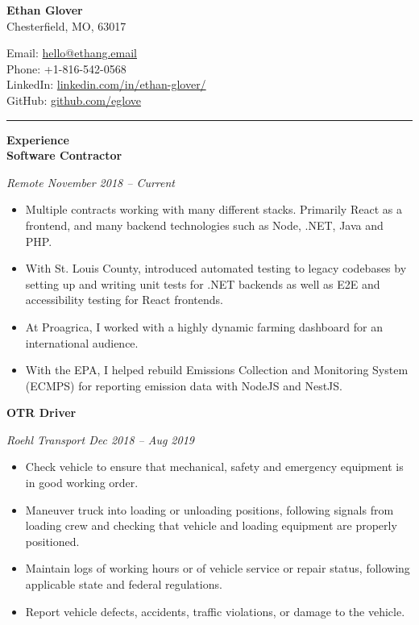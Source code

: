 \documentclass[a4ppaper, 10pt]{article}
\newcommand{\heading}[1]{\vspace{6pt}\noindent\textbf{\large #1}\vspace{4pt}\\}
\newcommand{\subheading}[1]{\vspace{2pt}\noindent\textbf{#1}\par}
\begin{document}
	\begin{center}
		{\LARGE \textbf{Ethan Glover}} \\
		Chesterfield, MO, 63017
		\begin{multicols}{2}
			\raggedright
			Email: \href{mailto:hello@ethang.email}{hello@ethang.email} \\
			Phone: +1-816-542-0568 \\
			LinkedIn: \href{https://www.linkedin.com/in/ethan-glover/}{linkedin.com/in/ethan-glover/} \\
			GitHub: \href{https://github.com/eglove}{github.com/eglove}
		\end{multicols}
	\end{center}
	
	\hrule
	
	\heading{Experience}
	\subheading{Software Contractor}
	\raggedright
	\textit{Remote \hfill November 2018 -- Current} \\
	\begin{itemize}[itemsep=0pt, topsep=2pt]
		\item Multiple contracts working with many different stacks. Primarily React as a frontend, and many backend technologies such as Node, .NET, Java and PHP.
		\item With St. Louis County, introduced automated testing to legacy codebases by setting up and writing unit tests for .NET backends as well as E2E and accessibility testing for React frontends.
		\item At Proagrica, I worked with a highly dynamic farming dashboard for an international audience.
		\item With the EPA, I helped rebuild Emissions Collection and Monitoring System (ECMPS) for reporting emission data with NodeJS and NestJS.
	\end{itemize}
	
	\subheading{OTR Driver}
	\raggedright
	\textit{Roehl Transport \hfill Dec 2018 -- Aug 2019}
	\begin{itemize}[itemsep=0pt, topsep=2pt]
		\item Check vehicle to ensure that mechanical, safety and emergency equipment is in good working order. 
		\item Maneuver truck into loading or unloading positions, following signals from loading crew and checking that vehicle and loading equipment are properly positioned.
		\item Maintain logs of working hours or of vehicle service or repair status, following applicable state and federal regulations.
		\item Report vehicle defects, accidents, traffic violations, or damage to the vehicle.
	\end{itemize}
	
\end{document}
